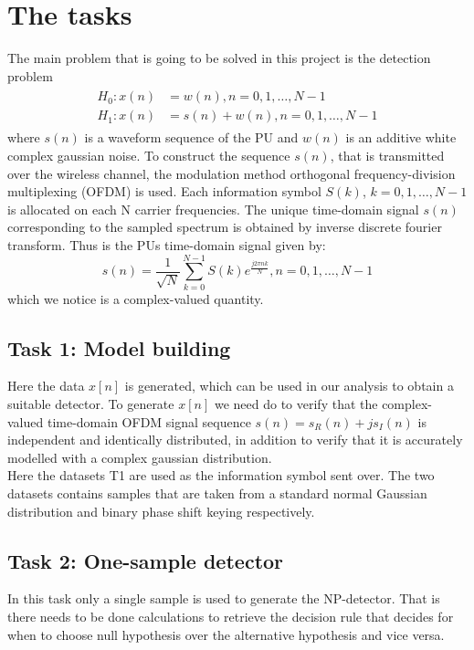 \section{The tasks}\label{sec:task}
The main problem that is going to be solved in this project is the detection problem
\begin{align}
\begin{split}
	H_0: x(n) & = w(n), n = 0, 1, \dots, N-1\\
	H_1: x(n) & = s(n) + w(n), n = 0, 1, \dots, N-1
\end{split}
\end{align}\label{eq:detection_problem}
where $s(n)$ is a waveform sequence of the PU and $w(n)$ is an additive white complex gaussian noise.
To construct the sequence $s(n)$, that is transmitted over the wireless channel, the modulation method orthogonal frequency-division multiplexing (OFDM) is used. Each information symbol $S(k)$, $k=0,1,\dots,N-1$ is allocated on each N carrier frequencies. The unique time-domain signal $s(n)$ corresponding to the sampled spectrum is obtained by inverse discrete fourier transform. Thus is the PUs time-domain signal given by:
\begin{equation}
	s(n) = \frac{1}{\sqrt{N}}\sum_{k=0}^{N-1}S(k)e^{\frac{j2\pi nk}{N}}, n = 0,1,\dots,N-1
\end{equation}
which we notice is a complex-valued quantity.
\subsection{Task 1: Model building}
Here the data $x[n]$ is generated, which can be used in our analysis to obtain a suitable detector. To generate $x[n]$ we need do to verify that the complex-valued time-domain OFDM signal sequence $s(n) = s_R(n)+js_I(n)$ is independent and identically distributed, in addition to verify that it is accurately modelled with a complex gaussian distribution.\\
Here the datasets T1 are used as the information symbol sent over. The two datasets contains samples that are taken from a standard normal Gaussian distribution and binary phase shift keying respectively.
\subsection{Task 2: One-sample detector}
In this task only a single sample is used to generate the NP-detector. That is there needs to be done calculations to retrieve the decision rule that decides for when to choose null hypothesis over the alternative hypothesis and vice versa.
